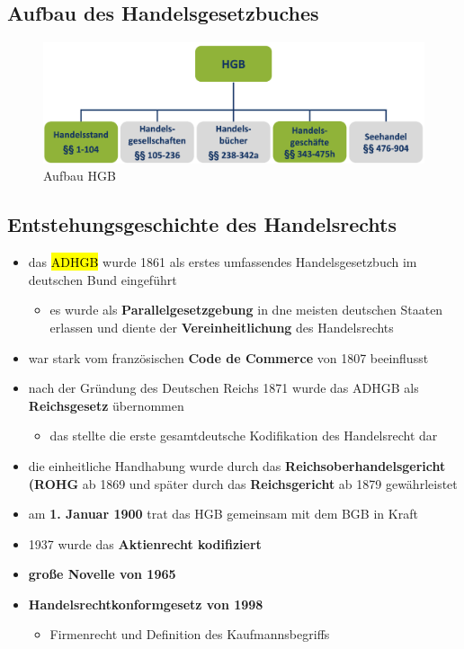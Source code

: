 \documentclass[a4paper, 10pt]{article}
\begin{document}
\subsection{Aufbau des Handelsgesetzbuches}
\begin{figure}[h]
    \centering
    \includegraphics[width=0.6\linewidth]{Bildschirmfoto 2024-10-30 um 11.30.26.png}
    \caption{Aufbau HGB}
    \label{fig:enter-label}
\end{figure}

\subsection{Entstehungsgeschichte des Handelsrechts}
\begin{itemize}
    \item das \hl{ADHGB} wurde 1861 als erstes umfassendes Handelsgesetzbuch im deutschen Bund eingeführt
    \begin{itemize}
        \item es wurde als \textbf{Parallelgesetzgebung} in dne meisten deutschen Staaten erlassen und diente der \textbf{Vereinheitlichung} des Handelsrechts
    \end{itemize}
    \item war stark vom französischen \textbf{Code de Commerce} von 1807 beeinflusst
    \item nach der Gründung des Deutschen Reichs 1871 wurde das ADHGB als \textbf{Reichsgesetz} übernommen
    \begin{itemize}
        \item das stellte die erste gesamtdeutsche Kodifikation des Handelsrecht dar
    \end{itemize}

    \item die einheitliche Handhabung wurde durch das \textbf{Reichsoberhandelsgericht (ROHG} ab 1869 und später durch das \textbf{Reichsgericht} ab 1879 gewährleistet

    \item am \textbf{1. Januar 1900} trat das HGB gemeinsam mit dem BGB in Kraft

    \item 1937 wurde das \textbf{Aktienrecht kodifiziert}
    \item \textbf{große Novelle von 1965}
    \item \textbf{Handelsrechtkonformgesetz von 1998}
    \begin{itemize}
        \item Firmenrecht und Definition des Kaufmannsbegriffs
    \end{itemize}
\end{itemize}
\end{document}
